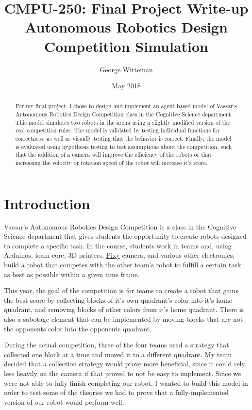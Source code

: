 \documentclass[12pt]{article}
\title{CMPU-250: Final Project Write-up \\
  \large Autonomous Robotics Design Competition Simulation}
\date{May 2018}
\author{George Witteman}
\begin{document}
\maketitle

\begin{abstract}
  For my final project, I chose to design and implement an agent-based model of Vassar's Autonomous Robotics Design Competition class in the Cognitive Science department. This model simulates two robots in the arena using a slightly modified version of the real competition rules. The model is validated by testing individual functions for correctness, as well as visually testing that the behavior is correct. Finally, the model is evaluated using hypothesis testing to test assumptions about the competition, such that the addition of a camera will improve the efficiency of the robots or that increasing the velocity or rotation speed of the robot will increase it's score.
\end{abstract}

\section{Introduction}

Vassar's Autonomous Robotics Design Competition is a class in the Cognitive Science department that gives students the opportunity to create robots designed to complete a specific task. In the course, students work in teams and, using Arduinos, foam core, 3D printers, \href{http://charmedlabs.com/default/pixy-cmucam5/}{Pixy} camera, and various other electronics, build a robot that competes with the other team's robot to fulfill a certain task as best as possible within a given time frame.

This year, the goal of the competition is for teams to create a robot that gains the best score by collecting blocks of it's own quadrant's color into it's home quadrant, and removing blocks of other colors from it's home quadrant. There is also a sabotage element that can be implemented by moving blocks that are not the opponents color into the opponents quadrant.

During the actual competition, three of the four teams used a strategy that collected one block at a time and moved it to a different quadrant. My team decided that a collection strategy would prove more beneficial, since it could rely less heavily on the camera if that proved to not be easy to implement. Since we were not able to fully finish completing our robot, I wanted to build this model in order to test some of the theories we had to prove that a fully-implemented version of our robot would perform well.
\end{document}
